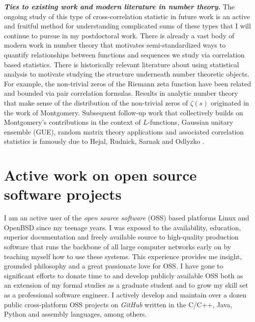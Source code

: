 \documentclass[10pt,reqno,letterpaper]{article}
\theoremstyle{plain}
\numberwithin{theorem}{section}
\theoremstyle{definition}
\begin{document}
\noindent 
{\small \textbf{\emph{Ties to existing work and modern literature in number theory.}}} 
The ongoing study of this type of cross-correlation statistic in future work is an active and 
fruitful method for understanding complicated sums of these types 
that I will continue to pursue in my postdoctoral work. 
There is already a vast body of modern work in number theory that motivates 
semi-standardized ways to quantify relationships between functions and sequences we study via 
correlation based statistics. There is historically relevant literature about using 
statistical analysis to motivate studying the structure underneath number theoretic objects. 
For example, the non-trivial zeros of the Riemann zeta function have been related and 
bounded via pair correlation formulas. 
Results in analytic number theory that make sense of the distribution of the 
non-trivial zeros of $\zeta(s)$ originated in the work of Montgomery. 
Subsequent follow-up work that collectively builds on Montgomery’s contributions in the 
context of $L$-functions, Gaussian unitary ensemble (GUE), 
random matrix theory applications and associated correlation statistics is 
famously due to Hejal, Rudnick, Sarnak and Odlyzko 
\cite{WILLIAMS-BARRETT-SURVEY-2016}. 

\section{Active work on open source software projects}

I am an active user of the \emph{open source software} (OSS) based 
platforms Linux and OpenBSD since my 
teenage years. I was exposed to the availability, education, superior documentation and 
freely available source to high-quality production software that runs the backbone of all large 
computer networks early on by teaching myself how to use these systems. This experience provides me 
insight, grounded philosophy and a great passionate love for OSS. I have gone to significant efforts to 
donate time to and develop publicly available OSS both as an extension of my formal studies as 
a graduate student and to grow my skill set as a professional software engineer. 
I actively develop and maintain 
over a dozen public cross-platform OSS projects on \emph{GitHub} 
written in the C/C++, Java, Python and assembly languages, among others.
\end{document}
